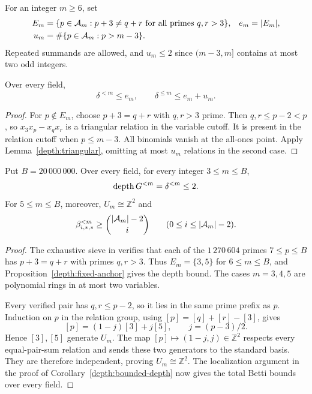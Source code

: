 For an integer $m\ge6$, set
\[
 \begin{aligned}
 E_m&=\{p\in\mathcal A_m:p+3\ne q+r\text{ for all primes }q,r>3\},
       &e_m&=|E_m|,\\
 u_m&=\#\{p\in\mathcal A_m:p>m-3\}.&&
 \end{aligned}
\]
Repeated summands are allowed, and $u_m\le2$ since $(m-3,m]$ contains at most two odd integers.

\begin{proposition}\label{depth:fixed-anchor}
Over every field,
\[
 \delta^{<m}\le e_m,
 \qquad\delta^{\le m}\le e_m+u_m.
\]
\end{proposition}
\begin{proof}
For $p\notin E_m$, choose $p+3=q+r$ with $q,r>3$ prime. Then
$q,r\le p-2<p$, so $x_3x_p-x_qx_r$ is a triangular relation in the
variable cutoff. It is present in the relation cutoff when $p\le m-3$.
All binomials vanish at the all-ones point. Apply
Lemma~\ref{depth:triangular}, omitting at most $u_m$ relations in the
second case.
\end{proof}

\begin{corollary}
\label{depth:verified-range}
Put $B=20\,000\,000$. Over every field, for every integer $3\le m\le B$,
\[
 \operatorname{depth} G^{<m}=\delta^{<m}\le2.
\]
For $5\le m\le B$, moreover, $U_m\cong\mathbb Z^2$ and
\[
 \beta^{<m}_{i,*,*}\ge\binom{|\mathcal A_m|-2}{i}
 \qquad(0\le i\le|\mathcal A_m|-2).
\]
\end{corollary}
\begin{proof}
The exhaustive sieve in
 verifies that
each of the $1\,270\,604$ primes $7\le p\le B$ has
$p+3=q+r$ with primes $q,r>3$. Thus $E_m=\{3,5\}$ for
$6\le m\le B$, and Proposition~\ref{depth:fixed-anchor} gives the
depth bound. The cases $m=3,4,5$ are polynomial rings in at most two
variables.

Every verified pair has $q,r\le p-2$, so it lies in the same prime
prefix as $p$. Induction on $p$ in the relation group, using
$[p]=[q]+[r]-[3]$, gives
\[
 [p]=(1-j)[3]+j[5],\qquad j=(p-3)/2.
\]
Hence $[3],[5]$ generate $U_m$. The map
$[p]\mapsto(1-j,j)\in\mathbb Z^2$ respects every equal-pair-sum
relation and sends these two generators to the standard basis.
They are therefore independent, proving $U_m\cong\mathbb Z^2$.
The localization argument in the proof of
Corollary~\ref{depth:bounded-depth} now gives the total Betti bounds
over every field.
\end{proof}

